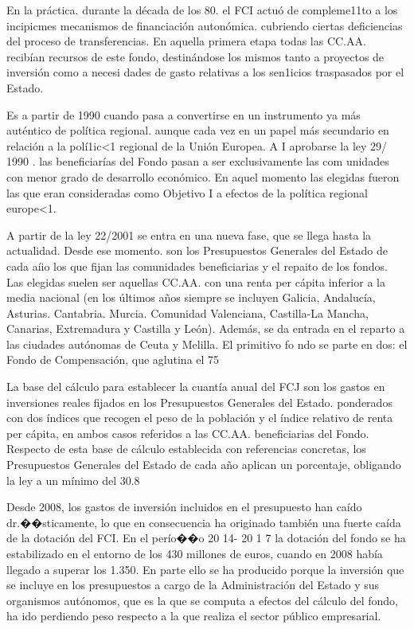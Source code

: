 \documentclass[10pt,a4paper]{article}
\begin{document}
En la práctica. durante la década de los 80. el FCI actuó de compleme11to a los incipicmes mecanismos de financiación autonómica. cubriendo ciertas deficiencias del proceso de transferencias. En aquella primera etapa todas las CC.AA. recibían recursos de este fondo, destinándose los mismos tanto a proyectos de inversión como a necesi dades de gasto relativas a los sen1icios traspasados por el Estado.

Es a partir de 1990 cuando pasa a convertirse en un instrumento ya más auténtico de política regional. aunque cada vez en un papel más secundario en relación a la polí1ic<1 regional de la Unión Europea. A I aprobarse la ley 29/ 1990 . las beneficiarías del Fondo pasan a ser exclusivamente las com unidades con menor grado de desarrollo económico. En aquel momento las elegidas fueron las que eran consideradas como Objetivo I a efectos de la política regional europe<1.

A partir de la ley 22/2001 se entra en una nueva fase, que se llega hasta la actualidad. Desde ese momento. son los Presupuestos Generales del Estado de cada aíio los que fijan las comunidades beneficiarias y el repaito de los fondos. Las elegidas suelen ser aquellas CC.AA. con una renta per cápita inferior a la media nacional (en los últimos años siempre se incluyen Galicia, Andalucía, Asturias. Cantabria. Murcia. Comunidad Valenciana, Castilla-La Mancha, Canarias, Extremadura y Castilla y León). Además, se da entrada en el reparto a las ciudades autónomas de Ceuta y Melilla. El primitivo fo ndo se parte en dos: el Fondo de Compensación, que aglutina el 75%

La base del cálculo para establecer la cuantía anual del FCJ son los gastos en inversiones reales fijados en los Presupuestos Generales del Estado. ponderados con dos índices que recogen el peso de la población y el índice relativo de renta per cápita, en ambos casos referidos a las CC.AA. beneficiarias del Fondo. Respecto de esta base de cálculo establecida con referencias concretas, los Presupuestos Generales del Estado de cada año aplican un porcentaje, obligando la ley a un mínimo del 30.8%

Desde 2008, los gastos de inversión incluidos en el presupuesto han caído dr.��sticamente, lo que en consecuencia ha originado también una fuerte caída de la dotación del FCI. En el perío��o 20 14- 20 1 7 la dotación del fondo se ha estabilizado en el entorno de los 430 millones de euros, cuando en 2008 había llegado a superar los 1.350. En parte ello se ha producido porque la inversión que se incluye en los presupuestos a cargo de la Administración del Estado y sus organismos autónomos, que es la que se computa a efectos del cálculo del fondo, ha ido perdiendo peso respecto a la que realiza el sector público empresarial.
\end{document}
